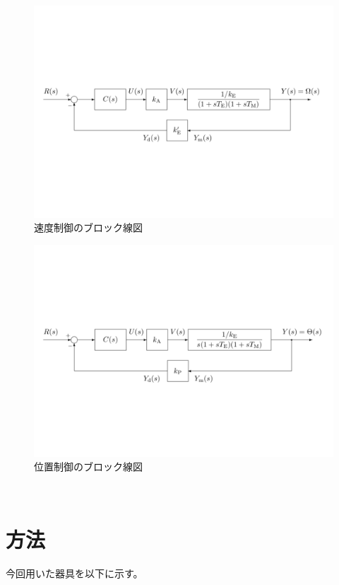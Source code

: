 \documentclass[uplatex, 11pt,a4j, titlepage]{jsarticle}
\begin{document}
\begin{figure}[h]
    \centering
    \includegraphics[width=12cm]{pv.pdf}
    \caption{速度制御のブロック線図}
    \label{pv}
\end{figure}

\begin{figure}[h]
    \centering
    \includegraphics[width=12cm]{p.pdf}
    \caption{位置制御のブロック線図}
    \label{p}
\end{figure}

\newpage 
\ 
\newpage 
\section{方法}

今回用いた器具を以下に示す。
\end{document}
